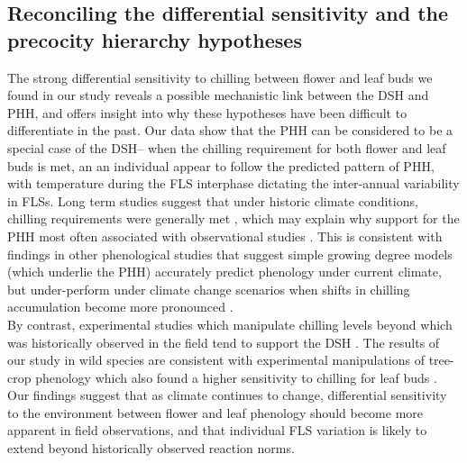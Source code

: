 \documentclass[11pt]{article}
\begin{document}
\subsection*{Reconciling the differential sensitivity and the precocity hierarchy hypotheses}
The strong differential sensitivity to chilling between flower and leaf buds we found in our study reveals a possible mechanistic link between the DSH and PHH, and offers insight into why these hypotheses have been difficult to differentiate in the past. Our data show that the PHH can be considered to be a special case of the DSH-- when the chilling requirement for both flower and leaf buds is met, an an individual appear to follow the predicted pattern of PHH, with temperature during the FLS interphase dictating the inter-annual variability in FLSs. Long term studies suggest that under historic climate conditions, chilling requirements were generally met \citep{}, which may explain why support for the PHH most often associated with observational studies \citep[e.g.][]{COSMULESCU:2020aa,Guo2014}. This is consistent with findings in other phenological studies that suggest simple growing degree models (which underlie the PHH) accurately predict phenology under current climate, but under-perform under climate change scenarios when shifts in chilling accumulation become more pronounced \citep{Linkosalo2008}.\\ %

\noindent By contrast, experimental studies which manipulate chilling levels beyond which was historically observed in the field tend to support the DSH \citep[e.g.][]{Aslani2009,Gariglio2006}. The results of our study in wild species are consistent with experimental manipulations of tree-crop phenology which also found a higher sensitivity to chilling for leaf buds \citep{Gariglio2006,Citadin2001}. Our findings suggest that as climate continues to change, differential sensitivity to the environment between flower and leaf phenology should become more apparent in field observations, and that individual FLS variation is likely to extend beyond historically observed reaction norms. %
\end{document}
